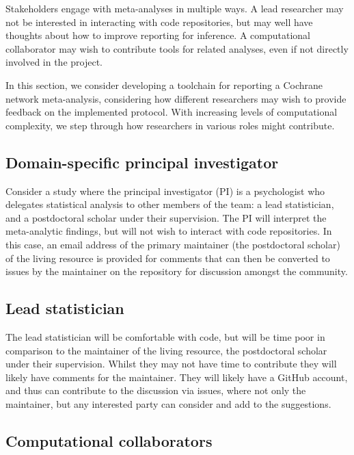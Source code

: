 \documentclass[12pt]{article}\usepackage[]{graphicx}\usepackage[]{color}
\begin{document}


Stakeholders engage with meta-analyses in multiple ways. A lead researcher may not be interested in interacting with code repositories, but may well have thoughts about how to improve reporting for inference. A computational collaborator may wish to contribute tools for related analyses, even if not directly involved in the project.

In this section, we consider developing a toolchain for reporting a Cochrane network meta-analysis, considering how different researchers may wish to provide feedback on the implemented protocol. With increasing levels of computational complexity, we step through how researchers in various roles might contribute.

\subsection{Domain-specific principal investigator}

Consider a study where the principal investigator (PI) is a psychologist who delegates statistical analysis to other members of the team: a lead statistician, and a postdoctoral scholar under their supervision. The PI will interpret the meta-analytic findings, but will not wish to interact with code repositories. In this case, an email address of the primary maintainer (the postdoctoral scholar) of the living resource is provided for comments that can then be converted to issues by the maintainer on the repository for discussion amongst the community.

\subsection{Lead statistician}

The lead statistician will be comfortable with code, but will be time poor in comparison to the maintainer of the living resource, the postdoctoral scholar under their supervision. Whilst they may not have time to contribute they will likely have comments for the maintainer. They will likely have a GitHub account, and thus can contribute to the discussion via issues, where not only the maintainer, but any interested party can consider and add to the suggestions.

\subsection{Computational collaborators}
\end{document}
